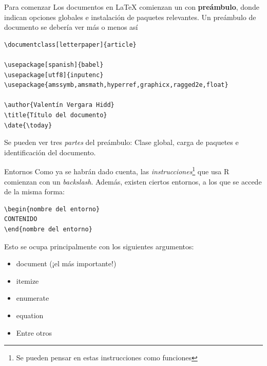 \documentclass[compress,svgnames]{beamer}
\begin{document}

\begin{frame}[fragile]{Para comenzar}
Los documentos en \LaTeX{} comienzan un con {\bf preámbulo}, donde indican opciones globales e instalación de paquetes relevantes. Un preámbulo de documento se debería ver más o menos así
\begin{lstlisting}
\documentclass[letterpaper]{article}

\usepackage[spanish]{babel}
\usepackage[utf8]{inputenc}
\usepackage{amssymb,amsmath,hyperref,graphicx,ragged2e,float}

\author{Valentín Vergara Hidd}
\title{Título del documento}
\date{\today}
\end{lstlisting}

Se pueden ver tres \emph{partes} del preámbulo: Clase global, carga de paquetes e identificación del documento.
\end{frame}


\begin{frame}[fragile]{Entornos}
Como ya se habrán dado cuenta, las \emph{instrucciones}\footnote{Se pueden pensar en estas instrucciones como funciones} que usa R comienzan con un \emph{backslash}. Además, existen ciertos entornos, a los que se accede de la misma forma:
\begin{lstlisting}
\begin{nombre del entorno}
CONTENIDO
\end{nombre del entorno}
\end{lstlisting}

Esto se ocupa principalmente con los siguientes argumentos:
\begin{itemize}
	\item document (¡el más importante!)
	\item itemize
	\item enumerate
	\item equation
	\item Entre otros
\end{itemize}
\end{frame}
\end{document}
